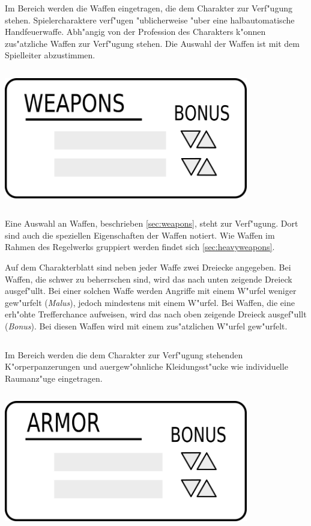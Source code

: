 \begin{column}[l]{0.55}
    Im Bereich  werden die Waffen eingetragen, die dem Charakter zur Verf"ugung stehen. Spielercharaktere verf"ugen "ublicherweise "uber eine halbautomatische Handfeuerwaffe. Abh"angig von der Profession des Charakters k"onnen zus"atzliche Waffen zur Verf"ugung stehen. Die Auswahl der Waffen ist mit dem Spielleiter abzustimmen.
\end{column}
\begin{column}[r]{0.45}
    \centering
    \includegraphics[width=0.80\textwidth]{images/character_weapons.png}
\end{column}
\medskip

Eine Auswahl an Waffen, beschrieben \cref{sec:weapons}, steht zur Verf"ugung. Dort sind auch die speziellen Eigenschaften der Waffen notiert. Wie Waffen im Rahmen des Regelwerks gruppiert werden findet sich \cref{sec:heavyweapons}.

Auf dem Charakterblatt sind neben jeder Waffe zwei Dreiecke angegeben. Bei Waffen, die schwer zu beherrschen sind, wird das nach unten zeigende Dreieck ausgef"ullt. Bei einer solchen Waffe werden Angriffe mit einem W"urfel weniger gew"urfelt (\emph{Malus}), jedoch mindestens mit einem W"urfel. Bei Waffen, die eine erh"ohte Trefferchance aufweisen, wird das nach oben zeigende Dreieck ausgef"ullt (\emph{Bonus}). Bei diesen Waffen wird mit einem zus"atzlichen W"urfel gew"urfelt.

\begin{column}[l]{0.55}
    Im Bereich  werden die dem Charakter zur Verf"ugung stehenden K"orperpanzerungen und au\3ergew"ohnliche Kleidungsst"ucke wie individuelle Raumanz"uge eingetragen.
\end{column}
\begin{column}[r]{0.45}
    \centering
    \includegraphics[width=0.80\textwidth]{images/character_armor.png}
\end{column}
\medskip

